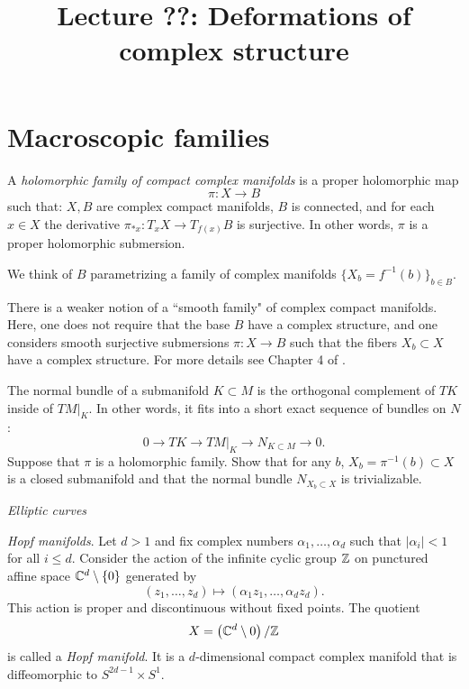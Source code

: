 \documentclass[11pt]{amsart}
\title{Lecture ??: Deformations of complex structure}
\begin{document}
\maketitle

\section{Macroscopic families}

\begin{dfn} 
A {\em holomorphic family of compact complex manifolds} is a proper holomorphic map
\[
\pi :  X \to B
\]
such that: $X, B$ are complex compact manifolds, $B$ is connected, and for each $x \in X$ the derivative $\pi_{*x} : T_x X \to T_{f(x)} B$ is surjective. 
In other words, $\pi$ is a proper holomorphic submersion. 
\end{dfn}

We think of $B$ parametrizing a family of complex manifolds $\{X_b = f^{-1}(b)\}_{b \in B}$. 

\begin{rmk}
There is a weaker notion of a ``smooth family" of complex compact manifolds. 
Here, one does not require that the base $B$ have a complex structure, and one considers smooth surjective submersions $\pi : X \to B$ such that the fibers $X_b \subset X$ have a complex structure. 
For more details see Chapter 4 of \cite{KSdef}. 
\end{rmk}

\begin{ex} 
The normal bundle of a submanifold $K \subset M$ is the orthogonal complement of $TK$ inside of $TM |_K$. 
In other words, it fits into a short exact sequence of bundles on $N$:
\[
0 \to TK \to TM |_K \to N_{K \subset M} \to 0 .
\]
Suppose that $\pi$ is a holomorphic family.
Show that for any $b$, $X_b = \pi^{-1}(b) \subset X$ is a closed submanifold and that the normal bundle $N_{X_b \subset X}$ is trivializable. 
\end{ex}

\begin{eg} {\em Elliptic curves}
\end{eg}

\begin{eg} {\em Hopf manifolds}.
Let $d > 1$ and fix complex numbers $\alpha_1,\ldots,\alpha_d$ such that $|\alpha_i| < 1$ for all $i\leq d$.
Consider the action of the infinite cyclic group $\mathbb Z$ on punctured affine space $\mathbb C^d \setminus \{0\}$ generated by
\[
(z_1,\ldots, z_d) \mapsto (\alpha_1 z_1,\ldots, \alpha_d z_d) .
\]
This action is proper and discontinuous without fixed points. 
The quotient 
\[
X = \left(\mathbb C^d \setminus 0\right) / \mathbb Z
\]
is called a {\em Hopf manifold}. 
It is a $d$-dimensional compact complex manifold that is diffeomorphic to $S^{2d-1} \times S^1$. 
\end{eg}
\end{document}
